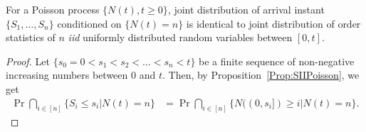 \documentclass[a4paper,10pt,english]{article}
\begin{document}
\begin{prop}%
For a Poisson process $\{N(t), t\geqslant 0\}$, joint distribution of arrival instant $\{S_1, \ldots, S_n\}$ conditioned on $\{N(t)=n\}$ is identical to joint distribution of order statistics of $n$ \emph{iid} uniformly distributed random variables between $[0,t]$.
\end{prop}
\begin{proof} Let $\{ s_0 = 0 < s_1 < s_2 <\ldots < s_n < t \}$ be a finite sequence of non-negative increasing numbers between $0$ and $t$. Then, by Proposition~\ref{Prop:SIIPoisson}, we get
\begin{align*}
\Pr\bigcap_{i \in [n]}\{S_i \leq s_i | N(t) = n\} &= \Pr\bigcap_{i \in [n]}\{N((0, s_i]) \geq i | N(t) = n\}.
\end{align*}
\end{proof}
\end{document}
